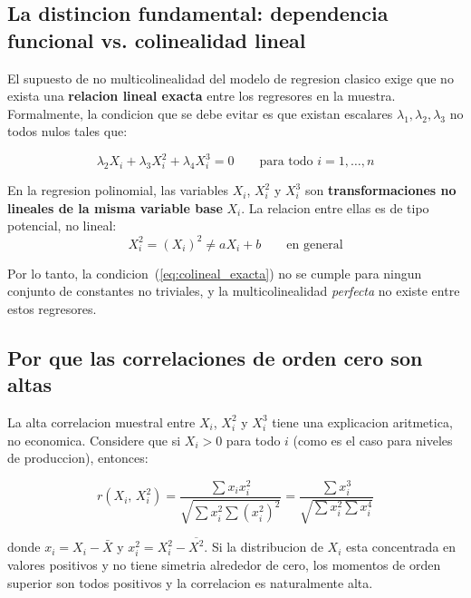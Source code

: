 \documentclass[12pt, letterpaper]{article}
\theoremstyle{remark}
\begin{document}
\subsection{La distincion fundamental: dependencia funcional vs. colinealidad lineal}

El supuesto de no multicolinealidad del modelo de regresion clasico exige que
no exista una \textbf{relacion lineal exacta} entre los regresores en la muestra.
Formalmente, la condicion que se debe evitar es que existan escalares
$\lambda_1, \lambda_2, \lambda_3$ no todos nulos tales que:

\begin{equation}
  \lambda_2 X_i + \lambda_3 X_i^2 + \lambda_4 X_i^3 = 0
  \qquad \text{para todo } i = 1, \ldots, n
  \label{eq:colineal_exacta}
\end{equation}

En la regresion polinomial, las variables $X_i$, $X_i^2$ y $X_i^3$ son
\textbf{transformaciones no lineales de la misma variable base} $X_i$.
La relacion entre ellas es de tipo potencial, no lineal:
\begin{equation}
  X_i^2 = (X_i)^2 \neq aX_i + b \qquad \text{en general}
  \label{eq:no_lineal}
\end{equation}

\noindent Por lo tanto, la condicion~(\ref{eq:colineal_exacta}) no se cumple
para ningun conjunto de constantes no triviales, y la multicolinealidad
\emph{perfecta} no existe entre estos regresores.

\subsection{Por que las correlaciones de orden cero son altas}

La alta correlacion muestral entre $X_i$, $X_i^2$ y $X_i^3$ tiene una
explicacion aritmetica, no economica. Considere que si $X_i > 0$ para todo $i$
(como es el caso para niveles de produccion), entonces:

\begin{equation}
  r(X_i,\, X_i^2)
    = \frac{\sum x_i x_i^2}{\sqrt{\sum x_i^2 \sum (x_i^2)^2}}
    = \frac{\sum x_i^3}{\sqrt{\sum x_i^2 \sum x_i^4}}
  \label{eq:corr_x_x2}
\end{equation}

\noindent donde $x_i = X_i - \bar X$ y $x_i^2 = X_i^2 - \overline{X^2}$.
Si la distribucion de $X_i$ esta concentrada en valores positivos y no tiene
simetria alrededor de cero, los momentos de orden superior son todos positivos
y la correlacion es naturalmente alta.
\end{document}
